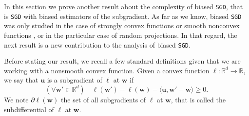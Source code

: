\documentclass[10pt]{article} %
\renewcommand{\vec}[1]{\bm{#1}}
\newcommand{\bw}{\bm{w}}
\newcommand{\SGD}{\texttt{SGD}}
\begin{document}
In this section we prove another result about the complexity of biased \SGD{}, that is \SGD{} with biased estimators of the subgradient.
As far as we know, biased \SGD{} was only studied in the case of strongly convex functions or smooth nonconvex functions \citep{DemMalSokRic23}, or in the particular case of random projections.
In that regard, the next result is a new contribution to the analysis of biased \SGD{}.

Before stating our result, we recall a few standard definitions given that we are working with a nonsmooth convex function. 
Given a convex function $\ell : \mathbb{R}^d \to \mathbb{R}$, we say that $\vec{u}$ is a subgradient of $\ell$ at $\bw$ if
\begin{equation*}
    (\forall \bw' \in \mathbb{R}^d) \quad  \ell(\bw') - \ell(\bw) - \langle \vec{u}, \bw' - \bw \rangle \geq 0.
\end{equation*}
We note $\partial \ell (\bw)$ the set of all subgradients of $\ell$ at $\bw$, that is called the subdifferential of $\ell$ at $\bw$.
\end{document}
